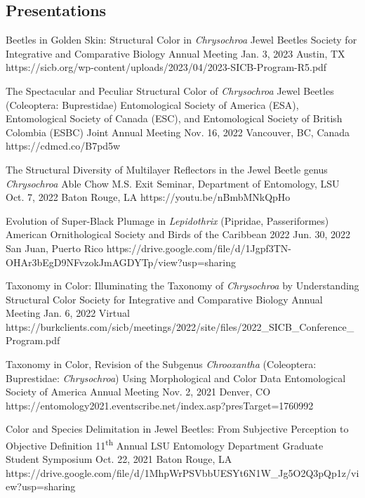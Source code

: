\documentclass{article}
\newcommand{\ts}{\textsuperscript}
\begin{document}
\subsection{Presentations}
{Beetles in Golden Skin: Structural Color in \textit{Chrysochroa} Jewel Beetles}
{Society for Integrative and Comparative Biology Annual Meeting}
{Jan. 3, 2023}
{Austin, TX}
{https://sicb.org/wp-content/uploads/2023/04/2023-SICB-Program-R5.pdf}

{The Spectacular and Peculiar Structural Color of \textit{Chrysochroa} Jewel Beetles (Coleoptera: Buprestidae)} 
{Entomological Society of America (ESA), Entomological Society of Canada (ESC), and Entomological Society of British Colombia (ESBC) Joint Annual Meeting}
{Nov. 16, 2022}
{Vancouver, BC, Canada}
{https://cdmcd.co/B7pd5w}

{The Structural Diversity of Multilayer Reflectors in the Jewel Beetle genus \textit{Chrysochroa}}
{Able Chow M.S. Exit Seminar, Department of Entomology, LSU}
{Oct. 7, 2022}
{Baton Rouge, LA}
{https://youtu.be/nBmbMNkQpHo}

{Evolution of Super-Black Plumage in \textit{Lepidothrix} (Pipridae, Passeriformes)}
{American Ornithological Society and Birds of the Caribbean 2022}
{Jun. 30, 2022}
{San Juan, Puerto Rico}
{https://drive.google.com/file/d/1Jgpf3TN-OHAr3bEgD9NFvzokJmAGDYTp/view?usp=sharing}

{Taxonomy in Color: Illuminating the Taxonomy of \textit{Chrysochroa} by Understanding Structural Color}
{Society for Integrative and Comparative Biology Annual Meeting} 
{Jan. 6, 2022}
{Virtual}
{https://burkclients.com/sicb/meetings/2022/site/files/2022_SICB_Conference_Program.pdf}

{Taxonomy in Color, Revision of the Subgenus \textit{Chrooxantha} (Coleoptera: Buprestidae: \textit{Chrysochroa}) Using Morphological and Color Data}
{Entomological Society of America Annual Meeting}
{Nov. 2, 2021}
{Denver, CO}
{https://entomology2021.eventscribe.net/index.asp?presTarget=1760992}

{Color and Species Delimitation in Jewel Beetles: From Subjective Perception to Objective Definition}
{11\ts{th} Annual LSU Entomology Department Graduate Student Symposium}
{Oct. 22, 2021}
{Baton Rouge, LA}
{https://drive.google.com/file/d/1MhpWrPSVbbUESYt6N1W_Jg5O2Q3pQp1z/view?usp=sharing}
\end{document}
